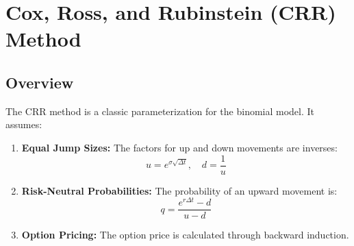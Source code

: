 \documentclass[11pt]{article}
\providecommand{\tightlist}{%
      \setlength{\itemsep}{0pt}\setlength{\parskip}{0pt}}
\begin{document}
\pagebreak

    \section{Cox, Ross, and Rubinstein (CRR)
Method}\label{cox-ross-and-rubinstein-crr-method}

\subsection{Overview}\label{overview}

The CRR method is a classic parameterization for the binomial model. It
assumes:
\begin{enumerate}
\tightlist
    \item \textbf{Equal Jump Sizes:} The factors for up and down
movements are inverses: \[ u = e^{\sigma \sqrt{\Delta t}}, \quad d = \frac{1}{u} \]
    \item \textbf{Risk-Neutral Probabilities:} The
probability of an upward movement is: \[ q = \frac{e^{r \Delta t} - d}{u - d} \]
    \item \textbf{Option Pricing:} The
option price is calculated through backward induction.
\end{enumerate}
\end{document}
